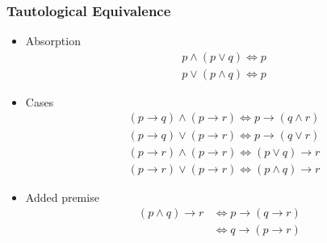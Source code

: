 \documentclass{article}
\theoremstyle{definition}
\begin{document}
\subsubsection{Tautological Equivalence}
\begin{itemize}
    \item Absorption
        \begin{align*}
            &   p \land (p \lor q) \Leftrightarrow p    \\
            &   p \lor (p \land q) \Leftrightarrow p
        \end{align*}
    \item Cases
        \begin{align*}
            & (p\rightarrow q)\land(p\rightarrow r) \Leftrightarrow p\rightarrow (q\land r)\\
            & (p\rightarrow q)\lor(p\rightarrow r) \Leftrightarrow p\rightarrow (q\lor r)\\
            & (p\rightarrow r)\land(p\rightarrow r) \Leftrightarrow (p\lor q)\rightarrow r\\
            & (p\rightarrow r)\lor(p\rightarrow r) \Leftrightarrow (p\land q)\rightarrow r
        \end{align*}
    \item Added premise
        \begin{align*}
            (p\land q)\rightarrow r &\Leftrightarrow p\rightarrow(q\rightarrow r)\\
                                    &\Leftrightarrow q\rightarrow (p\rightarrow r)
        \end{align*}
\end{itemize}
\end{document}
